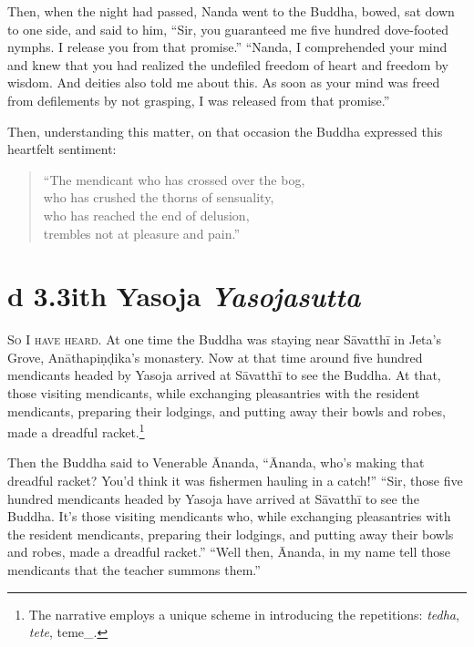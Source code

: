 \documentclass[12pt,openany]{book}%
\newcommand*{\suttatitleacronym}[1]{\smaller[2]{#1}\vspace*{.3em}}
\newcommand*{\suttatitletranslation}[1]{\linebreak{#1}}
\newcommand*{\suttatitleroot}[1]{\linebreak\smaller[2]\itshape{#1}}
\newcommand*{\tocacronym}[1]{\hspace*{-3.3em}{#1}\quad}
\newcommand*{\toctranslation}[1]{#1}
\newcommand*{\tocroot}[1]{(\textit{#1})}
\newcommand*{\scevam}[1]{\textsc{#1}}
\begin{document}
Then, when the night had passed, Nanda went to the Buddha, bowed, sat down to one side, and said to him, “Sir, you guaranteed me five hundred dove-footed nymphs. I release you from that promise.” “Nanda, I comprehended your mind and knew that you had realized the undefiled freedom of heart and freedom by wisdom. And deities also told me about this. As soon as your mind was freed from defilements by not grasping, I was released from that promise.” 

Then, understanding this matter, on that occasion the Buddha expressed this heartfelt sentiment: 

\begin{verse}%
“The mendicant who has crossed over the bog, \\
who has crushed the thorns of sensuality, \\
who has reached the end of delusion, \\
trembles not at pleasure and pain.” 

%
\end{verse}

%
\section*{{\suttatitleacronym Ud 3.3}{\suttatitletranslation With Yasoja }{\suttatitleroot Yasojasutta}}
\addcontentsline{toc}{section}{\tocacronym{Ud 3.3} \toctranslation{With Yasoja } \tocroot{Yasojasutta}}

\scevam{So I have heard. }At one time the Buddha was staying near \textsanskrit{Sāvatthī} in Jeta’s Grove, \textsanskrit{Anāthapiṇḍika}’s monastery. Now at that time around five hundred mendicants headed by Yasoja arrived at \textsanskrit{Sāvatthī} to see the Buddha. At that, those visiting mendicants, while exchanging pleasantries with the resident mendicants, preparing their lodgings, and putting away their bowls and robes, made a dreadful racket.\footnote{The narrative employs a unique scheme in introducing the repetitions: \textit{tedha}, \textit{tete}, teme\_. } 

Then the Buddha said to Venerable Ānanda, “Ānanda, who’s making that dreadful racket? You’d think it was fishermen hauling in a catch!” “Sir, those five hundred mendicants headed by Yasoja have arrived at \textsanskrit{Sāvatthī} to see the Buddha. It’s those visiting mendicants who, while exchanging pleasantries with the resident mendicants, preparing their lodgings, and putting away their bowls and robes, made a dreadful racket.” “Well then, Ānanda, in my name tell those mendicants that the teacher summons them.” 
\end{document}
